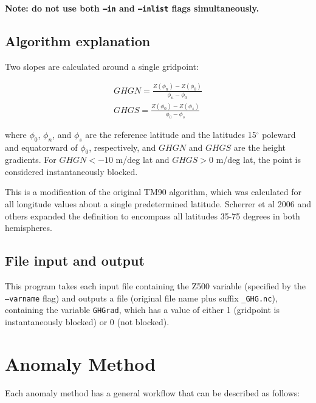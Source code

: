 \documentclass{article}
\begin{document}
\textbf{Note: do not use both \texttt{--in} and \texttt{--inlist} flags simultaneously.}

\subsection{Algorithm explanation}

Two slopes are calculated around a single gridpoint:

\begin{eqnarray}
GHGN=\frac{Z(\phi_n)-Z(\phi_0)}{\phi_n-\phi_0}\\
GHGS=\frac{Z(\phi_0)-Z(\phi_s)}{\phi_0-\phi_s}
\end{eqnarray}

\noindent where $\phi_0$, $\phi_n$, and $\phi_s$ are the reference latitude and the latitudes 15$^\circ$ poleward and equatorward of $\phi_0$, respectively, and $GHGN$ and $GHGS$ are the height gradients. For $GHGN<-10$ m/deg lat and $GHGS>0$ m/deg lat, the point is considered instantaneously blocked.

This is a modification of the original TM90 algorithm, which was calculated for all longitude values about a single predetermined latitude. Scherrer et al 2006 and others expanded the definition to encompass all latitudes 35-75 degrees in both hemispheres.


\subsection{File input and output}


This program takes each input file containing the Z500 variable (specified by the \texttt{--varname} flag) and outputs a file (original file name plus suffix \texttt{\_GHG.nc}), containing the variable \texttt{GHGrad}, which has a value of either 1 (gridpoint is instantaneously blocked) or 0 (not blocked).

\section{Anomaly Method}\label{anom}

Each anomaly method has a general workflow that can be described as follows:
\end{document}
